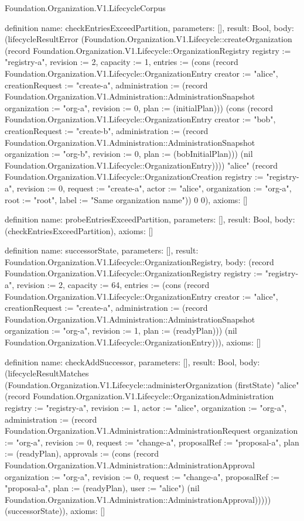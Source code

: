 \begin{lexlean}{Foundation.Organization.V1.LifecycleCorpus}
\begin{semanticmodule}
definition{
  name: checkEntriesExceedPartition,
  parameters: [],
  result: Bool,
  body: (lifecycleResultError (Foundation.Organization.V1.Lifecycle::createOrganization (record Foundation.Organization.V1.Lifecycle::OrganizationRegistry {registry := "registry-a", revision := 2, capacity := 1, entries := (cons (record Foundation.Organization.V1.Lifecycle::OrganizationEntry {creator := "alice", creationRequest := "create-a", administration := (record Foundation.Organization.V1.Administration::AdministrationSnapshot {organization := "org-a", revision := 0, plan := (initialPlan)})}) (cons (record Foundation.Organization.V1.Lifecycle::OrganizationEntry {creator := "bob", creationRequest := "create-b", administration := (record Foundation.Organization.V1.Administration::AdministrationSnapshot {organization := "org-b", revision := 0, plan := (bobInitialPlan)})}) (nil Foundation.Organization.V1.Lifecycle::OrganizationEntry)))}) "alice" (record Foundation.Organization.V1.Lifecycle::OrganizationCreation {registry := "registry-a", revision := 0, request := "create-a", actor := "alice", organization := "org-a", root := "root", label := "Same organization name"})) 0 0),
  axioms: []
}

definition{
  name: probeEntriesExceedPartition,
  parameters: [],
  result: Bool,
  body: (checkEntriesExceedPartition),
  axioms: []
}

definition{
  name: successorState,
  parameters: [],
  result: Foundation.Organization.V1.Lifecycle::OrganizationRegistry,
  body: (record Foundation.Organization.V1.Lifecycle::OrganizationRegistry {registry := "registry-a", revision := 2, capacity := 64, entries := (cons (record Foundation.Organization.V1.Lifecycle::OrganizationEntry {creator := "alice", creationRequest := "create-a", administration := (record Foundation.Organization.V1.Administration::AdministrationSnapshot {organization := "org-a", revision := 1, plan := (readyPlan)})}) (nil Foundation.Organization.V1.Lifecycle::OrganizationEntry))}),
  axioms: []
}

definition{
  name: checkAddSuccessor,
  parameters: [],
  result: Bool,
  body: (lifecycleResultMatches (Foundation.Organization.V1.Lifecycle::administerOrganization (firstState) "alice" (record Foundation.Organization.V1.Lifecycle::OrganizationAdministration {registry := "registry-a", revision := 1, actor := "alice", organization := "org-a", administration := (record Foundation.Organization.V1.Administration::AdministrationRequest {organization := "org-a", revision := 0, request := "change-a", proposalRef := "proposal-a", plan := (readyPlan), approvals := (cons (record Foundation.Organization.V1.Administration::AdministrationApproval {organization := "org-a", revision := 0, request := "change-a", proposalRef := "proposal-a", plan := (readyPlan), user := "alice"}) (nil Foundation.Organization.V1.Administration::AdministrationApproval))})})) (successorState)),
  axioms: []
}


\end{semanticmodule}
\end{lexlean}
